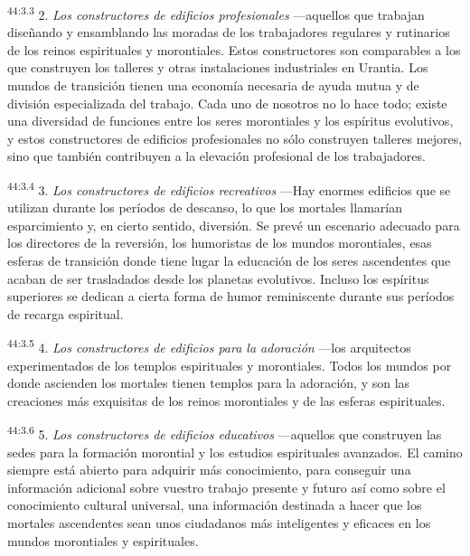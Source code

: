 \par
\textsuperscript{44:3.3} 2. \textit{Los constructores de edificios profesionales} ---aquellos que trabajan diseñando y ensamblando las moradas de los trabajadores regulares y rutinarios de los reinos espirituales y morontiales. Estos constructores son comparables a los que construyen los talleres y otras instalaciones industriales en Urantia. Los mundos de transición tienen una economía necesaria de ayuda mutua y de división especializada del trabajo. Cada uno de nosotros no lo hace todo; existe una diversidad de funciones entre los seres morontiales y los espíritus evolutivos, y estos constructores de edificios profesionales no sólo construyen talleres mejores, sino que también contribuyen a la elevación profesional de los trabajadores.

\par
\textsuperscript{44:3.4} 3. \textit{Los constructores de edificios recreativos} ---Hay enormes edificios que se utilizan durante los períodos de descanso, lo que los mortales llamarían esparcimiento y, en cierto sentido, diversión. Se prevé un escenario adecuado para los directores de la reversión, los humoristas de los mundos morontiales, esas esferas de transición donde tiene lugar la educación de los seres ascendentes que acaban de ser trasladados desde los planetas evolutivos. Incluso los espíritus superiores se dedican a cierta forma de humor reminiscente durante sus períodos de recarga espiritual.

\par
\textsuperscript{44:3.5} 4. \textit{Los constructores de edificios para la adoración} ---los arquitectos experimentados de los templos espirituales y morontiales. Todos los mundos por donde ascienden los mortales tienen templos para la adoración, y son las creaciones más exquisitas de los reinos morontiales y de las esferas espirituales.

\par
\textsuperscript{44:3.6} 5. \textit{Los constructores de edificios educativos} ---aquellos que construyen las sedes para la formación morontial y los estudios espirituales avanzados. El camino siempre está abierto para adquirir más conocimiento, para conseguir una información adicional sobre vuestro trabajo presente y futuro así como sobre el conocimiento cultural universal, una información destinada a hacer que los mortales ascendentes sean unos ciudadanos más inteligentes y eficaces en los mundos morontiales y espirituales.

